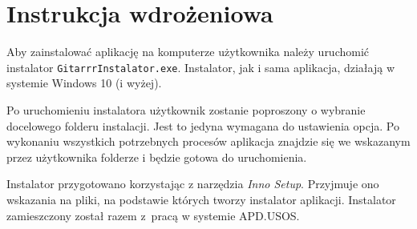 \chapter{Instrukcja wdrożeniowa}

Aby zainstalować aplikację na komputerze użytkownika należy uruchomić instalator \texttt{GitarrrInstalator.exe}. Instalator, jak i sama aplikacja, działają w systemie Windows 10 (i wyżej). 

Po uruchomieniu instalatora użytkownik zostanie poproszony o wybranie docelowego folderu instalacji. Jest to jedyna wymagana do ustawienia opcja. Po wykonaniu wszystkich potrzebnych procesów aplikacja znajdzie się we wskazanym przez użytkownika folderze i będzie gotowa do uruchomienia.

Instalator przygotowano korzystając z narzędzia \emph{Inno Setup}. Przyjmuje ono wskazania na pliki, na podstawie których tworzy instalator aplikacji. %
Instalator zamieszczony został razem z~pracą w systemie APD.USOS.

